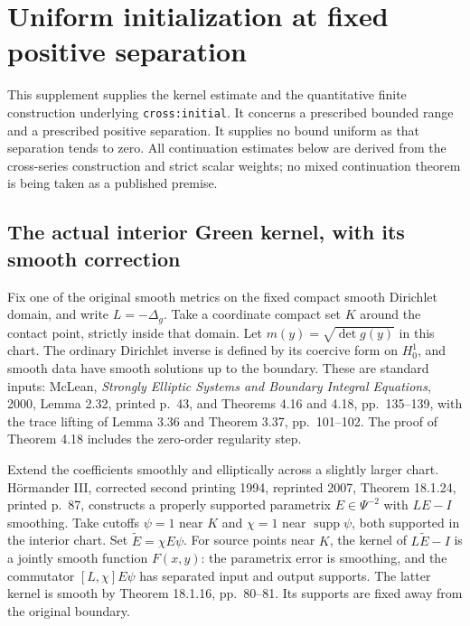 \documentclass[11pt]{article}
\theoremstyle{definition}
\theoremstyle{remark}
\numberwithin{equation}{section}
\begin{document}
\clearpage
\section{Uniform initialization at fixed positive separation}
\label{fixed-separation-supp:section}

This supplement supplies the kernel estimate and the quantitative finite
construction underlying \texttt{cross:initial}. It concerns a prescribed
bounded range and a prescribed positive separation. It supplies no bound
uniform as that separation tends to zero. All continuation estimates below
are derived from the cross-series construction and strict scalar weights;
no mixed continuation theorem is being taken as a published premise.

\subsection{The actual interior Green kernel, with its smooth correction}
\label{fixed-separation-supp:green}

Fix one of the original smooth metrics on the fixed compact smooth
Dirichlet domain, and write $L=-\Delta_g$. Take a coordinate compact set
$K$ around the contact point, strictly inside that domain. Let
$m(y)=\sqrt{\det g(y)}$ in this chart. The ordinary Dirichlet inverse is
defined by its coercive form on $H^1_0$, and smooth data have smooth
solutions up to the boundary. These are standard inputs: McLean,
\emph{Strongly Elliptic Systems and Boundary Integral Equations}, 2000,
Lemma 2.32, printed p.~43, and Theorems 4.16 and 4.18, pp.~135--139,
with the trace lifting of Lemma 3.36 and Theorem 3.37, pp.~101--102.
The proof of Theorem 4.18 includes the zero-order regularity step.

Extend the coefficients smoothly and elliptically across a slightly
larger chart. H\"ormander III, corrected second printing 1994, reprinted
2007, Theorem 18.1.24, printed p.~87, constructs a properly supported
parametrix $E\in\Psi^{-2}$ with $LE-I$ smoothing. Take cutoffs $\psi=1$
near $K$ and $\chi=1$ near $\operatorname{supp}\psi$, both supported in
the interior chart. Set $\widetilde E=\chi E\psi$. For source points
near $K$, the kernel of $L\widetilde E-I$ is a jointly smooth function
$F(x,y)$: the parametrix error is smoothing, and the commutator
$[L,\chi]E\psi$ has separated input and output supports. The latter
kernel is smooth by Theorem 18.1.16, pp.~80--81. Its supports are fixed
away from the original boundary.
\end{document}

